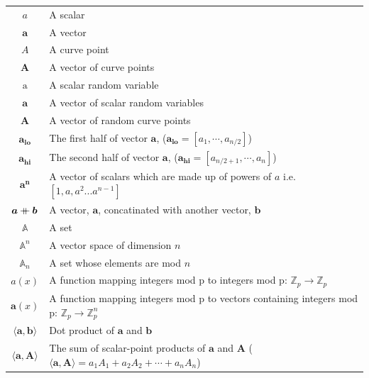 \documentclass{article}
\renewcommand{\vec}[1]{\boldsymbol{#1}}
\newcommand{\ran}[1]{\mathrm{#1}}
\newcommand{\vecran}[1]{\mathbf{#1}}
\newcommand{\Z}{\mathbb{Z}}
\newcommand\concat{\mathbin{+\mkern-10mu+}} %
\newcommand{\dotp}[2]{\langle #1, #2 \rangle}
\newcommand{\opn}[1]{\operatorname{#1}}
\newcommand{\veclo}[1]{\vec{#1_{\opn{lo}}}}
\newcommand{\vechi}[1]{\vec{#1_{\opn{hi}}}}
\begin{document}
\begin{center}
\begin{tabular}{ c l }
	$a$                         & A scalar \\
	$\vec{a}$                   & A vector \\
	$A$                         & A curve point \\
	$\vec{A}$                   & A vector of curve points \\
	$\ran{a}$                   & A scalar random variable \\
	$\vecran{a}$                & A vector of scalar random variables \\
	$\vecran{A}$                & A vector of random curve points \\
	$\veclo{a}$                 & The first half of vector $\vec{a}$, ($\veclo{a} = [a_{1}, \cdots, a_{n/2}]$) \\
	$\vechi{a}$                 & The second half of vector $\vec{a}$, ($\vechi{a} = [a_{n/2+1}, \cdots, a_{n}]$) \\
	$\vec{a^n}$                 & A vector of scalars which are made up of powers of $a$ i.e. $[1,a,a^2... a^{n-1}]$\\
	$\vec{a} \concat \vec{b}$   & A vector, $\vec{a}$, concatinated with another vector, $\vec{b}$\\
	$\mathbb{A}$                & A set \\
	$\mathbb{A}^n$              & A vector space of dimension $n$ \\ 
	$\mathbb{A}_n$              & A set whose elements are mod $n$ \\ 
	$a(x)$                      & A function mapping integers mod p to integers mod p: $\Z_p \rightarrow \Z_p$ \\
	$\vec{a}(x)$                & A function mapping integers mod p to vectors containing integers mod p: $\Z_p \rightarrow \Z^n_p$ \\
	$\dotp{\vec{a}}{\vec{b}}$   & Dot product of $\vec{a}$ and $\vec{b}$ \\
	$\dotp{\vec{a}}{\vec{A}}$   & The sum of scalar-point products of $\vec{a}$ and $\vec{A}$ ($\dotp{\vec{a}}{\vec{A}} = a_1 A_1 + a_2 A_2 + \cdots + a_n A_n$) \\
\end{tabular}
\end{center}
\end{document}
